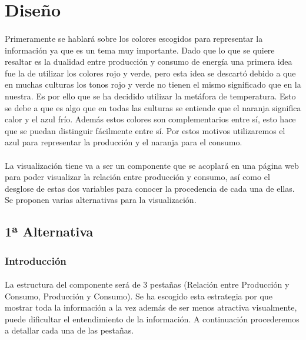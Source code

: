 \documentclass[11pt,spanish]{article}
\begin{document}
	\section{Diseño}

		\paragraph{}
		Primeramente se hablará sobre los colores escogidos para representar la información ya que es un tema muy importante. Dado que lo que se quiere resaltar es la dualidad entre producción y consumo de energía una primera idea fue la de utilizar los colores rojo y verde, pero esta idea se descartó debido a que en muchas culturas los tonos rojo y verde no tienen el mismo significado que en la nuestra. Es por ello que se ha decidido utilizar la metáfora de temperatura. Esto se debe a que es algo que en todas las culturas se entiende que el naranja significa calor y el azul frío. Además estos colores son complementarios entre sí, esto hace que se puedan distinguir fácilmente entre sí. Por estos motivos utilizaremos el azul para representar la producción y el naranja para el consumo.
		
		\paragraph{}
		La visualización tiene va a ser un componente que se acoplará en una página web para poder visualizar la relación entre producción y consumo, así como el desglose de estas dos variables para conocer la procedencia de cada una de ellas. Se proponen varias alternativas para la visualización.

		\subsection{1ª Alternativa}

			\subsubsection{Introducción}		

				\paragraph{}
				 La estructura del componente será de 3 pestañas (Relación entre Producción y Consumo, Producción y Consumo). Se ha escogido esta estrategia por que mostrar toda la información a la vez además de ser menos atractiva visualmente, puede dificultar el entendimiento de la información. A continuación procederemos a detallar cada una de las pestañas.
\end{document}
